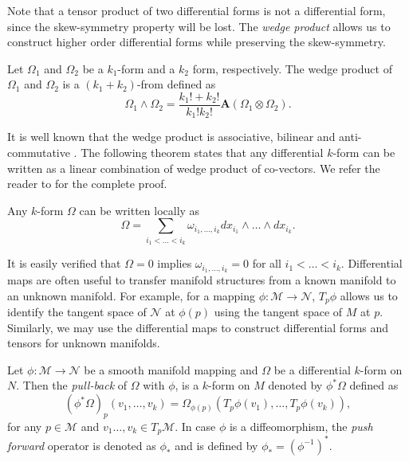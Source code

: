 Note that a tensor product of two differential forms is not a differential form, since the skew-symmetry property will be lost. The \emph{wedge product} allows us to construct higher order differential forms while preserving the skew-symmetry. 
\begin{definition}
Let $\Omega_1$ and $\Omega_2$ be a $k_1$-form and a $k_2$ form, respectively. The wedge product of $\Omega_1$ and $\Omega_2$ is a $(k_1+k_2)$-from defined as
\begin{equation} \label{eq:2.8}
	\Omega_1 \wedge \Omega_2 = \frac{k_1! + k_2!}{k_1!k_2!} \mathbf{A}(\Omega_1\otimes \Omega_2).
\end{equation}
\end{definition}
It is well known that the wedge product is associative, bilinear and anti-commutative \cite{marsden2013introduction}. The following theorem states that any differential $k$-form can be written as a linear combination of wedge product of co-vectors. We refer the reader to \cite{abraham1978foundations} for the complete proof.
\begin{theorem} \label{theorem:2.2}
Any $k$-form $\Omega$ can be written locally as
\begin{equation} \label{eq:2.9}
	\Omega = \sum_{i_1<\dots<i_k} \omega_{i_1,\dots,i_k} dx_{i_1}\wedge\dots\wedge dx_{i_k}.
\end{equation}
\end{theorem}

It is easily verified that $\Omega = 0$ implies $\omega_{i_1,\dots,i_k} = 0$ for all $i_1<\dots<i_k$. Differential maps are often useful to transfer manifold structures from a known manifold to an unknown manifold. For example, for a mapping $\phi:\mathcal M \to \mathcal N$, $T_p\phi$ allows us to identify the tangent space of $\mathcal N$ at $\phi(p)$ using the tangent space of $M$ at $p$. Similarly, we may use the differential maps to construct differential forms and tensors for unknown manifolds. 

\begin{definition}
Let $\phi:\mathcal M \to \mathcal N$ be a smooth manifold mapping and $\Omega$ be a differential $k$-form on $N$. Then the \emph{pull-back} of $\Omega$ with $\phi$, is a $k$-form on $M$ denoted by $\phi^*\Omega$ defined as
\[
	(\phi^*\Omega)_p(v_1,\dots,v_k) = \Omega_{\phi(p)}( T_p\phi(v_1) , \dots , T_p\phi(v_k) ),
\]
for any $p\in \mathcal M$ and $v_1\dots,v_k \in T_p \mathcal M$. In case $\phi$ is a diffeomorphism, the \emph{push forward} operator is denoted as $\phi_*$ and is defined by $\phi_* = (\phi^{-1})^*$.
\end{definition}

